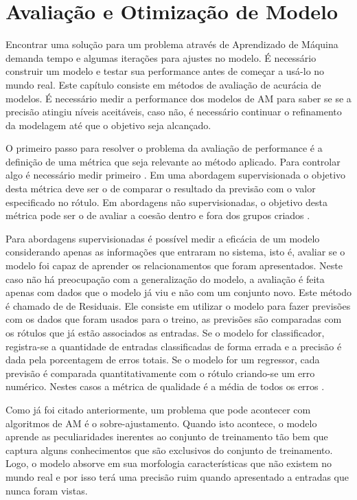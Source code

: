 \section{Avaliação e Otimização de Modelo}

Encontrar uma solução para um problema através de Aprendizado de Máquina demanda tempo e algumas iterações para ajustes no modelo. É necessário construir um modelo e testar sua performance antes de começar a usá-lo no mundo real. Este capítulo consiste em métodos  de avaliação de acurácia de modelos. É necessário medir a performance dos modelos de AM para saber se se a precisão atingiu níveis aceitáveis, caso não, é necessário continuar o refinamento da modelagem até que o objetivo seja alcançado. 

O primeiro passo para resolver o problema da avaliação de performance é a definição de uma métrica que seja relevante ao método aplicado. Para controlar algo é necessário medir primeiro \cite{hjames2014}. Em uma abordagem supervisionada o objetivo desta métrica deve ser o de comparar o resultado da previsão com o valor especificado no rótulo. Em abordagens não supervisionadas, o objetivo desta métrica pode ser o de avaliar a coesão dentro e fora dos grupos criados \cite{scikit2014}. 

Para abordagens supervisionadas é possível medir a eficácia de um modelo considerando apenas as informações que entraram no sistema, isto é, avaliar se o modelo foi capaz de aprender os relacionamentos que foram apresentados. Neste caso não há preocupação com a generalização do modelo, a avaliação é feita apenas com dados que o modelo já viu e não com um conjunto novo. Este método é chamado de de Residuais. Ele consiste em utilizar o modelo para fazer previsões com os dados que foram usados para o treino, as previsões são comparadas com os rótulos que já estão associados as entradas. Se o modelo for classificador, registra-se a quantidade de entradas classificadas de forma errada e a precisão é dada pela porcentagem de erros totais. Se o modelo for um regressor, cada previsão é comparada quantitativamente com o rótulo criando-se um erro numérico. Nestes casos a métrica de qualidade é a média de todos os erros \cite{jeff1997}. 

Como já foi citado anteriormente, um problema que pode acontecer com algoritmos de AM é o sobre-ajustamento. Quando isto acontece, o modelo aprende as peculiaridades inerentes ao conjunto de treinamento tão bem que captura alguns conhecimentos que são exclusivos do conjunto de treinamento. 
Logo, o modelo absorve em sua morfologia características que não existem no mundo real e por isso terá uma precisão ruim quando apresentado a entradas que nunca foram vistas. 

